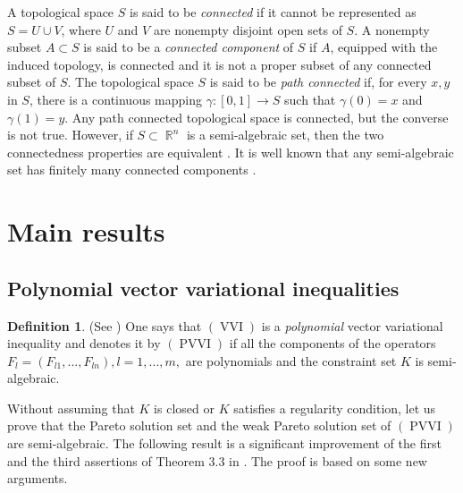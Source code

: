 \documentclass[]{interact}
\theoremstyle{plain}%
\theoremstyle{definition}
\newtheorem{definition}{Definition}[section]
\DeclareMathOperator{\PVVI}{PVVI}
\DeclareMathOperator{\R}{\mathbb{R}}
\DeclareMathOperator{\VVI}{VVI}
\begin{document}
A topological space $S$ is said to be \textit{connected} if it cannot be represented as $S=U\cup V$, where $U$ and $V$ are nonempty disjoint open sets of $S$. A nonempty subset $A\subset S$ is said to be a \textit{connected component} of  $S$ if $A$, equipped with the induced topology, is connected and it is not a proper subset of any connected subset of $S$. 
The topological space $S$ is said to be {\it path connected} if, for every $x, y$ in $S$, there is a continuous mapping $\gamma:[0,1]\to S$ such that $\gamma(0)=x$ and $\gamma(1)=y$. 
Any path connected topological space is connected, but the converse is not true. However, if $S\subset\R^n $ is a semi-algebraic set, then the two connectedness properties are equivalent \cite[Theorem 2.4.5  and Proposition 2.5.13]{BCF98}. It is well known that any semi-algebraic set has finitely many connected components \cite[Theorem 2.4.5]{BCF98}. 

\section{Main results}
\subsection{Polynomial vector variational inequalities}
\begin{definition} {\rm (See \cite{HYY2015b})} {\rm One says that $(\VVI)$ is a \textit{polynomial}  vector variational inequality and denotes it by $(\PVVI)$ if all the components of the operators 
		$F_{l}=(F_{l1}, . . . , F_{ln}), l=1,...,m,$ are polynomials and the constraint set $K$ is semi-algebraic.}
\end{definition}

Without assuming that $K$ is closed or $K$ satisfies a regularity condition, let us prove that the Pareto solution set and the weak Pareto solution set of $(\PVVI)$ are semi-algebraic. The following result is a significant improvement of the first and the third assertions of Theorem 3.3 in \cite{HYY2015b}. The proof is based on some new arguments.
\end{document}
